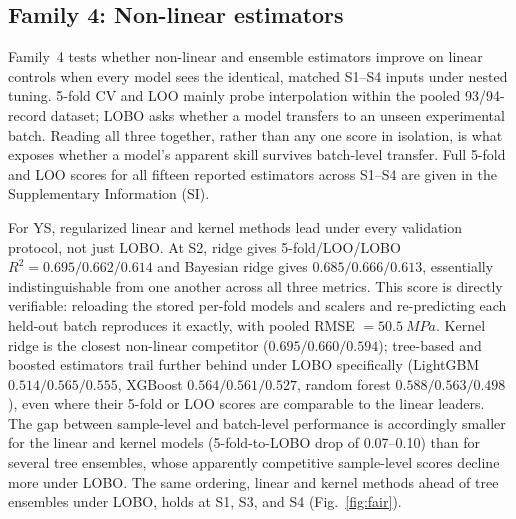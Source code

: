 \documentclass[5p,times,twocolumn]{elsarticle}
\newcommand{\familyfour}{Non-linear estimators}
\begin{document}
\subsection{Family 4: \familyfour}

Family~4 tests whether non-linear and ensemble estimators improve on linear controls when every model sees the identical, matched S1--S4 inputs under nested tuning. 5-fold CV and LOO mainly probe interpolation within the pooled 93/94-record dataset; LOBO asks whether a model transfers to an unseen experimental batch. Reading all three together, rather than any one score in isolation, is what exposes whether a model's apparent skill survives batch-level transfer. Full 5-fold and LOO scores for all fifteen reported estimators across S1--S4 are given in the Supplementary Information (SI).

For YS, regularized linear and kernel methods lead under every validation protocol, not just LOBO. At S2, ridge gives 5-fold/LOO/LOBO $R^2=0.695/0.662/0.614$ and Bayesian ridge gives $0.685/0.666/0.613$, essentially indistinguishable from one another across all three metrics. This score is directly verifiable: reloading the stored per-fold models and scalers and re-predicting each held-out batch reproduces it exactly, with pooled RMSE $=\SI{50.5}{MPa}$. Kernel ridge is the closest non-linear competitor ($0.695/0.660/0.594$); tree-based and boosted estimators trail further behind under LOBO specifically (LightGBM $0.514/0.565/0.555$, XGBoost $0.564/0.561/0.527$, random forest $0.588/0.563/0.498$), even where their 5-fold or LOO scores are comparable to the linear leaders. The gap between sample-level and batch-level performance is accordingly smaller for the linear and kernel models (5-fold-to-LOBO drop of 0.07--0.10) than for several tree ensembles, whose apparently competitive sample-level scores decline more under LOBO. The same ordering, linear and kernel methods ahead of tree ensembles under LOBO, holds at S1, S3, and S4 (Fig.~\ref{fig:fair}).
\end{document}
